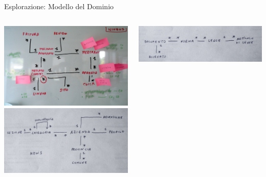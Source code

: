 	\begin{frame}{Esplorazione: Modello del Dominio}
		\begin{columns}[T]
		    \begin{column}{.5\textwidth}
				\includegraphics[scale=0.12]{images/domain-2}
				\\ \vspace*{0.4cm}
				\includegraphics[scale=0.15]{images/domain-4}
		    \end{column}
		    \begin{column}{.5\textwidth}
				\vspace*{0.3cm}
				\hspace*{-0.3cm} \includegraphics[scale=0.15]{images/domain-5}

\end{column}
\end{columns}
\end{frame}
